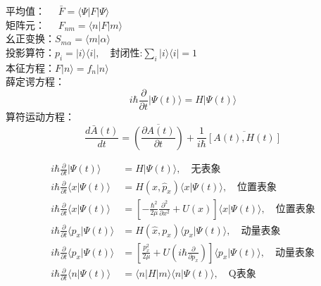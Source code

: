 \begin{frame} 
    平均值：  $\hspace{1em}\bar{F} = \langle \Psi |F | \Psi \rangle$ \\ \vspace{0.2em}
    矩阵元：  $\hspace{1em}F_{nm} = \langle n |F | m \rangle$ \\ \vspace{0.2em}
    幺正变换：$S_{m\alpha} =\langle m| \alpha \rangle $ \\ \vspace{0.2em}
    投影算符：$p_i = |i\rangle\langle i |, \quad \text{封闭性:} \sum_i |i\rangle\langle i |=1 $ \\ \vspace{0.2em}
    本征方程：$F|n\rangle =f_n |n\rangle$ \\ \vspace{0.2em}
    薛定谔方程：$$ i\hbar \frac{\partial }{\partial t} |\Psi(t)\rangle = H|\Psi(t)\rangle $$ 
    算符运动方程：$$ \frac{d\bar{A}(t)}{dt}=\overline{(\frac{\partial A(t) }{\partial t})}  +\frac{1}{i\hbar} \overline{[A(t),H(t)]}$$
\end{frame} 

\begin{frame} 
    \例 [求薛定谔方程在各表象中的形式]{} 
    $$ \begin{aligned}
    i \hbar \frac{\partial}{\partial t} |\Psi(t) \rangle &= H |\Psi(t) \rangle  , \quad \text{无表象}\\
    i \hbar \frac{\partial}{\partial t} \langle x|\Psi(t) \rangle &= H (x, \hat{p}_x) \langle x|\Psi(t) \rangle  , \quad \text{位置表象}\\
    i \hbar \frac{\partial}{\partial t} \langle x|\Psi(t) \rangle &= [- \frac{\hbar^2}{2\mu} \frac{\partial ^2 }{\partial x^2} + U(x)] \langle x|\Psi(t) \rangle  , \quad \text{位置表象}\\
    i \hbar \frac{\partial}{\partial t} \langle p_x|\Psi(t) \rangle &= H (\hat{x}, p_x) \langle p_x|\Psi(t) \rangle  , \quad \text{动量表象}\\
    i \hbar \frac{\partial}{\partial t} \langle p_x|\Psi(t) \rangle &=  [ \frac{p^2 _x}{2\mu} + U(i \hbar \frac{\partial }{\partial p_x}) ] \langle p_x|\Psi(t) \rangle  , \quad \text{动量表象}\\
    i \hbar \frac{\partial}{\partial t} \langle n|\Psi(t) \rangle &=  \langle n|H|m \rangle \langle n |\Psi(t) \rangle  , \quad \text{Q表象}\\
    \end{aligned}
    $$
\end{frame} 


